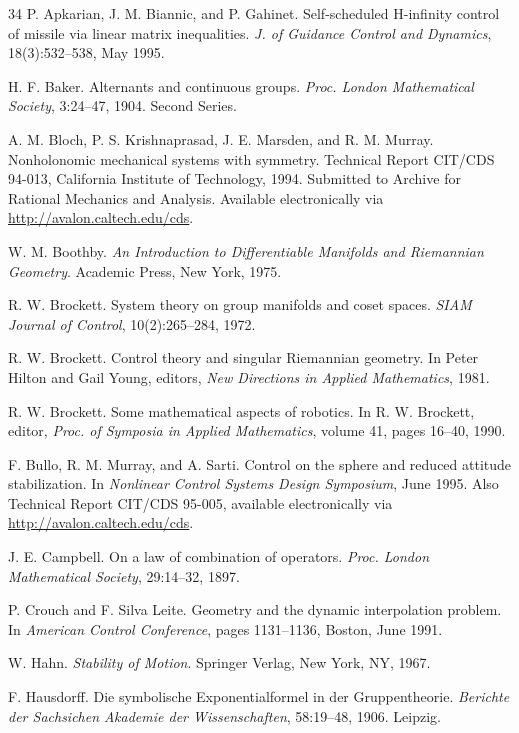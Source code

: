 \documentclass[11pt]{article}
\begin{document}
\begin{thebibliography}{34}
 P. Apkarian, J. M. Biannic, and P. Gahinet. Self-scheduled H-infinity control of missile via linear matrix inequalities. \emph{J. of Guidance Control and Dynamics}, 18(3):532--538, May 1995.

 H. F. Baker. Alternants and continuous groups. \emph{Proc. London Mathematical Society}, 3:24--47, 1904. Second Series.

 A. M. Bloch, P. S. Krishnaprasad, J. E. Marsden, and R. M. Murray. Nonholonomic mechanical systems with symmetry. Technical Report CIT/CDS 94-013, California Institute of Technology, 1994. Submitted to Archive for Rational Mechanics and Analysis. Available electronically via \url{http://avalon.caltech.edu/cds}.

 W. M. Boothby. \emph{An Introduction to Differentiable Manifolds and Riemannian Geometry}. Academic Press, New York, 1975.

 R. W. Brockett. System theory on group manifolds and coset spaces. \emph{SIAM Journal of Control}, 10(2):265--284, 1972.

 R. W. Brockett. Control theory and singular Riemannian geometry. In Peter Hilton and Gail Young, editors, \emph{New Directions in Applied Mathematics}, 1981.

 R. W. Brockett. Some mathematical aspects of robotics. In R. W. Brockett, editor, \emph{Proc. of Symposia in Applied Mathematics}, volume 41, pages 16--40, 1990.

 F. Bullo, R. M. Murray, and A. Sarti. Control on the sphere and reduced attitude stabilization. In \emph{Nonlinear Control Systems Design Symposium}, June 1995. Also Technical Report CIT/CDS 95-005, available electronically via \url{http://avalon.caltech.edu/cds}.

 J. E. Campbell. On a law of combination of operators. \emph{Proc. London Mathematical Society}, 29:14--32, 1897.

 P. Crouch and F. Silva Leite. Geometry and the dynamic interpolation problem. In \emph{American Control Conference}, pages 1131--1136, Boston, June 1991.

 W. Hahn. \emph{Stability of Motion}. Springer Verlag, New York, NY, 1967.

 F. Hausdorff. Die symbolische Exponentialformel in der Gruppentheorie. \emph{Berichte der Sachsichen Akademie der Wissenschaften}, 58:19--48, 1906. Leipzig.


\end{thebibliography}
\end{document}
